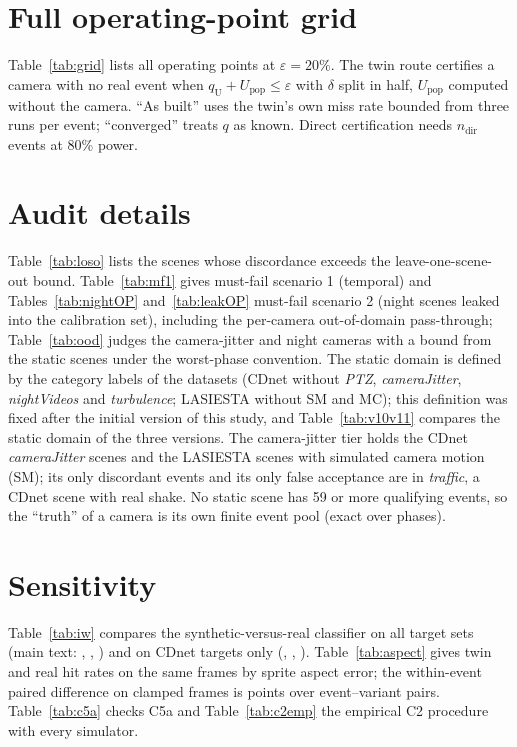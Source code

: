 \documentclass[11pt]{article}
\theoremstyle{definition}
\theoremstyle{remark}
\newcommand{\UCP}{U}
\begin{document}
\section{Full operating-point grid}
Table~\ref{tab:grid} lists all \nGridPts{} operating points at $\varepsilon=20\%$. The twin route certifies a camera with
no real event when $q_{\mathrm{U}}+\UCP_{\mathrm{pop}}\le\varepsilon$ with $\delta$ split in half, $\UCP_{\mathrm{pop}}$
computed without the camera. ``As built'' uses the twin's own miss rate bounded from three runs per event; ``converged''
treats $q$ as known. Direct certification needs $n_{\mathrm{dir}}$ events at 80\% power.

\section{Audit details}
Table~\ref{tab:loso} lists the scenes whose discordance exceeds the leave-one-scene-out bound. Table~\ref{tab:mf1} gives
must-fail scenario 1 (temporal) and Tables~\ref{tab:nightOP} and~\ref{tab:leakOP} must-fail scenario 2 (night scenes
leaked into the calibration set), including the per-camera out-of-domain pass-through; Table~\ref{tab:ood} judges
the camera-jitter and night cameras with a bound from the static scenes under the worst-phase convention. The static
domain is defined by the category labels of the datasets (CDnet without \emph{PTZ}, \emph{cameraJitter},
\emph{nightVideos} and \emph{turbulence}; LASIESTA without SM and MC); this definition was fixed after the initial
version of this study, and Table~\ref{tab:v10v11} compares the static domain of the three versions. The camera-jitter
tier holds the CDnet \emph{cameraJitter} scenes and the LASIESTA scenes with simulated camera motion (SM); its only
discordant events and its only false acceptance are in \emph{traffic}, a CDnet scene with real shake. No static scene has 59 or more
qualifying events, so the ``truth'' of a camera is its own finite event pool (exact over phases).

\section{Sensitivity}
Table~\ref{tab:iw} compares the synthetic-versus-real classifier on all target sets (main text: \nIWtemporal,
\nIWgeometry, \nIWappearance) and on CDnet targets only (\nIWtemporalCD, \nIWgeometryCD, \nIWappearanceCD).
Table~\ref{tab:aspect} gives twin and real hit rates on the same frames by sprite aspect error; the within-event paired
difference on clamped frames is \nClampExtraDrop{} points over \nClampPairs{} event--variant pairs.
Table~\ref{tab:c5a} checks C5a and Table~\ref{tab:c2emp} the empirical C2 procedure with every simulator.
\end{document}
